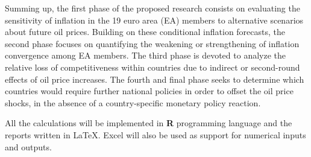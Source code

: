 \documentclass{article}\usepackage[]{graphicx}\usepackage[]{color}
\begin{document}
Summing up, the first phase of the proposed research consists on evaluating the sensitivity of inflation in the 19 euro area (EA) members to alternative scenarios about future oil prices. Building on these conditional inflation forecasts, the second phase focuses on quantifying the weakening or strengthening of inflation convergence among EA members. The third phase is devoted to analyze the relative loss of competitiveness within countries due to indirect or second-round effects of oil price increases. The fourth and final phase seeks to determine which countries would require further national policies in order to offset the oil price shocks, in the absence of a country-specific monetary policy reaction.

All the calculations will be implemented in \textbf{\textsf{R}} programming language and the reports written in {\LaTeX}. Excel will also be used as support for numerical inputs and outputs.



\end{document}

